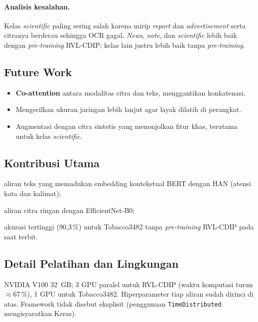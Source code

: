 \paragraph{Analisis kesalahan.} Kelas \emph{scientific} paling sering salah karena mirip
\emph{report} dan \emph{advertisement} serta citranya berderau sehingga OCR gagal.
\emph{News}, \emph{note}, dan \emph{scientific} lebih baik dengan \emph{pre-training}
RVL-CDIP; kelas lain justru lebih baik tanpa \emph{pre-training}.

\subsection{Future Work}
\begin{itemize}
  \item \textbf{Co-attention} antara modalitas citra dan teks, menggantikan konkatenasi.
  \item Mengecilkan ukuran jaringan lebih lanjut agar layak dilatih di perangkat.
  \item Augmentasi dengan citra sintetis yang menonjolkan fitur khas, terutama untuk kelas
        \emph{scientific}.
\end{itemize}

\subsection{Kontribusi Utama}
\begin{enumerate*}[label=(\alph*)]
  \item aliran teks yang memadukan embedding kontekstual BERT dengan HAN (atensi kata dan
        kalimat);
  \item aliran citra ringan dengan EfficientNet-B0;
  \item akurasi tertinggi (90,3\,\%) untuk Tobacco3482 tanpa \emph{pre-training} RVL-CDIP
        pada saat terbit.
\end{enumerate*}

\subsection{Detail Pelatihan dan Lingkungan}
NVIDIA V100 32~GB; 3 GPU paralel untuk RVL-CDIP (waktu komputasi turun $\approx$67\,\%),
1 GPU untuk Tobacco3482. Hiperparameter tiap aliran sudah dirinci di atas. Framework tidak
disebut eksplisit (penggunaan \texttt{TimeDistributed} mengisyaratkan Keras).

